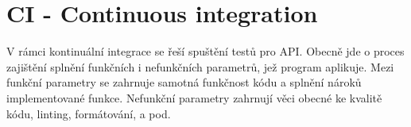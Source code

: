 \section{CI - Continuous integration}
V rámci kontinuální integrace se řeší spuštění testů pro API. Obecně jde o proces zajištění splnění funkčních i nefunkčních parametrů, jež program aplikuje. Mezi funkční parametry se zahrnuje samotná funkčnost kódu a splnění nároků implementované funkce. Nefunkční parametry zahrnují věci obecné ke kvalitě kódu, linting, formátování, a pod.
